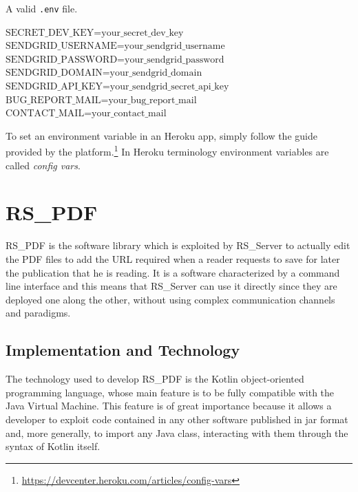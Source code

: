\documentclass[a4paper, english]{article}
\newcounter{subsubsubsection}[subsubsection]
\begin{document}
\begin{algorithm}[h]
\caption{A valid \texttt{.env} file.}
\label{env-file}
\begin{algorithmic}[1]
\State$\text{SECRET\_DEV\_KEY=your\_secret\_dev\_key}$
\State$\text{SENDGRID\_USERNAME=your\_sendgrid\_username}$
\State$\text{SENDGRID\_PASSWORD=your\_sendgrid\_password}$
\State$\text{SENDGRID\_DOMAIN=your\_sendgrid\_domain}$
\State$\text{SENDGRID\_API\_KEY=your\_sendgrid\_secret\_api\_key}$
\State$\text{BUG\_REPORT\_MAIL=your\_bug\_report\_mail}$
\State$\text{CONTACT\_MAIL=your\_contact\_mail}$
\end{algorithmic}
\end{algorithm}


\label{env-2}

To set an environment variable in an Heroku app, simply follow the guide provided by the platform.\footnote{\url{https://devcenter.heroku.com/articles/config-vars}} In Heroku terminology environment variables are called \emph{config vars}.

\section{RS\_PDF}

\label{rs-pdf}

RS\_PDF \cite{RS-PDF} is the software library which is exploited by RS\_Server to actually edit the PDF files to add the URL required when a reader requests to save for later the publication that he is reading. 
It is a software characterized by a command line interface and this means that RS\_Server can use it directly since they are deployed one along the other, without using complex communication channels and paradigms.    

\subsection{Implementation and Technology}

The technology used to develop RS\_PDF is the Kotlin object-oriented programming language, whose main feature is to be fully compatible with the Java Virtual Machine. This feature is of great importance because it allows a developer to exploit code contained in any other software published in jar format and, more generally, to import any Java class, interacting with them through the syntax of Kotlin itself.
\end{document}
